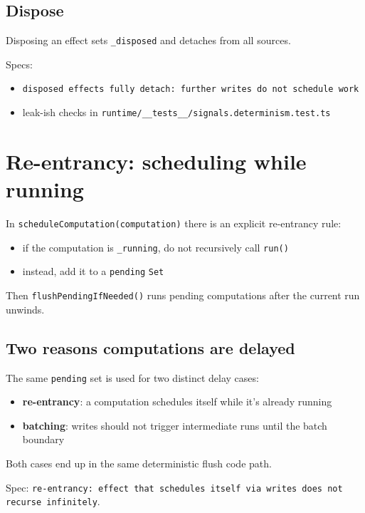 \subsection{Dispose}

Disposing an effect sets \texttt{\_disposed} and detaches from all sources.

Specs:

\begin{itemize}
  \item \texttt{disposed effects fully detach: further writes do not schedule work}
  \item leak-ish checks in \texttt{runtime/\_\_tests\_\_/signals.determinism.test.ts}
\end{itemize}

\section{Re-entrancy: scheduling while running}

In \texttt{scheduleComputation(computation)} there is an explicit re-entrancy rule:

\begin{itemize}
  \item if the computation is \texttt{\_running}, do not recursively call \texttt{run()}
  \item instead, add it to a \texttt{pending} \texttt{Set}
\end{itemize}

Then \texttt{flushPendingIfNeeded()} runs pending computations after the current run unwinds.

\subsection{Two reasons computations are delayed}

The same \texttt{pending} set is used for two distinct delay cases:

\begin{itemize}
  \item \textbf{re-entrancy}: a computation schedules itself while it’s already running
  \item \textbf{batching}: writes should not trigger intermediate runs until the batch boundary
\end{itemize}

Both cases end up in the same deterministic flush code path.

Spec: \texttt{re-entrancy: effect that schedules itself via writes does not recurse infinitely}.

